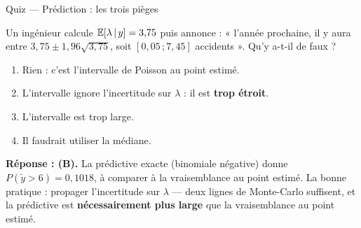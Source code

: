 \begin{frame}{Quiz --- Prédiction : les trois pièges}
\begin{qbox}
Un ingénieur calcule $\mathbb{E}[\lambda \,\vert\, y] = 3{,}75$ puis annonce : « l'année
prochaine, il y aura entre $3{,}75 \pm 1{,}96\sqrt{3{,}75}$, soit
$[0{,}05\,;7{,}45]$ accidents ». Qu'y a-t-il de faux ?
\vspace{1.5mm}
\begin{enumerate}
  \item[(A)] Rien : c'est l'intervalle de Poisson au point estimé.
  \item[(B)] L'intervalle ignore l'incertitude sur $\lambda$ : il est
        \textbf{trop étroit}.
  \item[(C)] L'intervalle est trop large.
  \item[(D)] Il faudrait utiliser la médiane.
\end{enumerate}
\vspace{1mm}
\textbf{Réponse : (B).} La prédictive exacte (binomiale négative) donne
$P(\tilde y > 6) = 0{,}1018$, à comparer à la vraisemblance au point estimé. La
bonne pratique : propager l'incertitude sur $\lambda$ --- deux lignes de
Monte-Carlo suffisent, et la prédictive est \textbf{nécessairement plus large}
que la vraisemblance au point estimé.
\end{qbox}
\end{frame}

